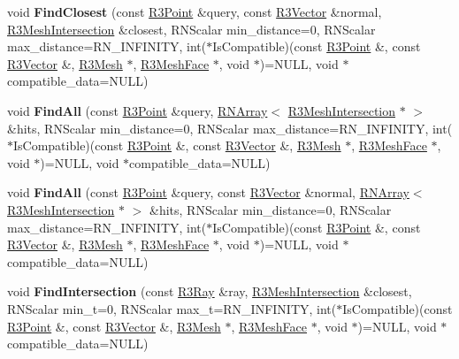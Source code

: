 \begin{DoxyCompactItemize}
\item 
void {\bfseries Find\+Closest} (const \hyperlink{class_r3_point}{R3\+Point} \&query, const \hyperlink{class_r3_vector}{R3\+Vector} \&normal, \hyperlink{struct_r3_mesh_intersection}{R3\+Mesh\+Intersection} \&closest, R\+N\+Scalar min\+\_\+distance=0, R\+N\+Scalar max\+\_\+distance=R\+N\+\_\+\+I\+N\+F\+I\+N\+I\+TY, int($\ast$Is\+Compatible)(const \hyperlink{class_r3_point}{R3\+Point} \&, const \hyperlink{class_r3_vector}{R3\+Vector} \&, \hyperlink{class_r3_mesh}{R3\+Mesh} $\ast$, \hyperlink{class_r3_mesh_face}{R3\+Mesh\+Face} $\ast$, void $\ast$)=N\+U\+LL, void $\ast$compatible\+\_\+data=N\+U\+LL)\hypertarget{class_r3_mesh_search_tree_a183cab25b1ce9030845719af134e1261}{}\label{class_r3_mesh_search_tree_a183cab25b1ce9030845719af134e1261}

\item 
void {\bfseries Find\+All} (const \hyperlink{class_r3_point}{R3\+Point} \&query, \hyperlink{class_r_n_array}{R\+N\+Array}$<$ \hyperlink{struct_r3_mesh_intersection}{R3\+Mesh\+Intersection} $\ast$ $>$ \&hits, R\+N\+Scalar min\+\_\+distance=0, R\+N\+Scalar max\+\_\+distance=R\+N\+\_\+\+I\+N\+F\+I\+N\+I\+TY, int($\ast$Is\+Compatible)(const \hyperlink{class_r3_point}{R3\+Point} \&, const \hyperlink{class_r3_vector}{R3\+Vector} \&, \hyperlink{class_r3_mesh}{R3\+Mesh} $\ast$, \hyperlink{class_r3_mesh_face}{R3\+Mesh\+Face} $\ast$, void $\ast$)=N\+U\+LL, void $\ast$compatible\+\_\+data=N\+U\+LL)\hypertarget{class_r3_mesh_search_tree_abefbc9c7200c5a0411c626a67bcb153f}{}\label{class_r3_mesh_search_tree_abefbc9c7200c5a0411c626a67bcb153f}

\item 
void {\bfseries Find\+All} (const \hyperlink{class_r3_point}{R3\+Point} \&query, const \hyperlink{class_r3_vector}{R3\+Vector} \&normal, \hyperlink{class_r_n_array}{R\+N\+Array}$<$ \hyperlink{struct_r3_mesh_intersection}{R3\+Mesh\+Intersection} $\ast$ $>$ \&hits, R\+N\+Scalar min\+\_\+distance=0, R\+N\+Scalar max\+\_\+distance=R\+N\+\_\+\+I\+N\+F\+I\+N\+I\+TY, int($\ast$Is\+Compatible)(const \hyperlink{class_r3_point}{R3\+Point} \&, const \hyperlink{class_r3_vector}{R3\+Vector} \&, \hyperlink{class_r3_mesh}{R3\+Mesh} $\ast$, \hyperlink{class_r3_mesh_face}{R3\+Mesh\+Face} $\ast$, void $\ast$)=N\+U\+LL, void $\ast$compatible\+\_\+data=N\+U\+LL)\hypertarget{class_r3_mesh_search_tree_a5bf9e9269c5bfe155aaf0c6de60b6de2}{}\label{class_r3_mesh_search_tree_a5bf9e9269c5bfe155aaf0c6de60b6de2}

\item 
void {\bfseries Find\+Intersection} (const \hyperlink{class_r3_ray}{R3\+Ray} \&ray, \hyperlink{struct_r3_mesh_intersection}{R3\+Mesh\+Intersection} \&closest, R\+N\+Scalar min\+\_\+t=0, R\+N\+Scalar max\+\_\+t=R\+N\+\_\+\+I\+N\+F\+I\+N\+I\+TY, int($\ast$Is\+Compatible)(const \hyperlink{class_r3_point}{R3\+Point} \&, const \hyperlink{class_r3_vector}{R3\+Vector} \&, \hyperlink{class_r3_mesh}{R3\+Mesh} $\ast$, \hyperlink{class_r3_mesh_face}{R3\+Mesh\+Face} $\ast$, void $\ast$)=N\+U\+LL, void $\ast$compatible\+\_\+data=N\+U\+LL)\hypertarget{class_r3_mesh_search_tree_add003fc4adeb66ee17dd49ee40a0b628}{}\label{class_r3_mesh_search_tree_add003fc4adeb66ee17dd49ee40a0b628}


\end{DoxyCompactItemize}
